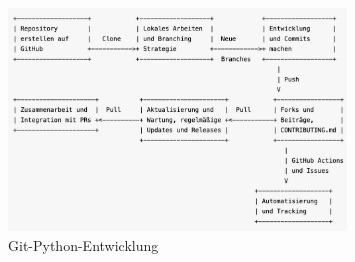 \documentclass{vorlage-design-main}
\begin{document}
\begin{figure}
\centering
\includegraphics[width=0.8\textwidth]{images/Git-Python-Entwicklung.pdf}
\caption{Git-Python-Entwicklung}
\end{figure}


\clearpage
\printbibliography
\end{document}
